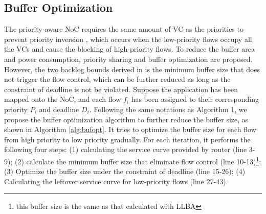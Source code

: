 \documentclass[10pt,journal]{IEEEtran}
\begin{document}
\subsection{Buffer Optimization}\label{bufferopt}
The priority-aware NoC \cite{Shi:2008:RCA:1397757.1397996} requires the same amount of VC as the priorities to prevent priority inversion \cite{707545}, which occurs when the low-priority flows occupy all the VCs and cause the blocking of high-priority flows. To reduce the buffer area and power consumption, priority sharing \cite{5161497} and buffer optimization \cite{189} are proposed. However, the two backlog bounds derived in \cite{189} is the minimum buffer size that does not trigger the flow control, which can be further reduced as long as the constraint of deadline is not be violated. Suppose the application has been mapped onto the NoC, and each flow $f_i$ has been assigned to their corresponding priority $P_i$ and deadline $D_i$. Following the same notations as Algorithm 1, we propose the buffer optimization algorithm to further reduce the buffer size, as shown in Algorithm \ref{alg:bufopt}. It tries to optimize the buffer size for each flow from high priority to low priority gradually. For each iteration, it performs the following four steps: (1) calculating the service curve provided by router (line 3-9); (2) calculate the minimum buffer size that eliminate flow control (line 10-13)\footnote{this buffer size is the same as that calculated with LLBA}; (3) Optimize the buffer size under the constraint of deadline (line 15-26); (4) Calculating the leftover service curve for low-priority flows (line 27-43).
\end{document}

